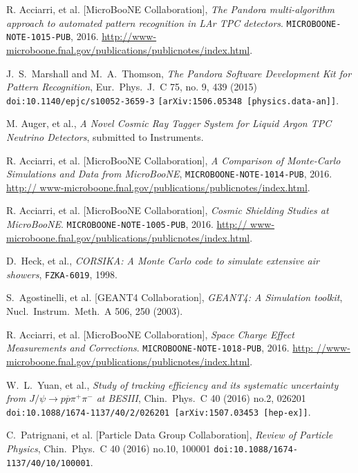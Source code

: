 \documentclass[a4paper]{scrartcl}
\begin{document}
\begin{thebibliography}{9}

   R. Acciarri, et al. [MicroBooNE Collaboration], \textit{The Pandora multi-algorithm approach to automated pattern recognition in LAr TPC detectors}. \texttt{MICROBOONE- NOTE-1015-PUB}, 2016. \url{http://www-microboone.fnal.gov/publications/publicnotes/index.html}.

   J.~S.~Marshall and M.~A.~Thomson, \textit{The Pandora Software Development Kit for Pattern Recognition}, Eur.\ Phys.\ J.\ C 75, no. 9, 439 (2015) \texttt{doi:10.1140/epjc/s10052-3659-3} \texttt{[arXiv:1506.05348 [physics.data-an]]}.

   M. Auger, et al., \textit{A Novel Cosmic Ray Tagger System for Liquid Argon TPC Neutrino Detectors}, submitted to Instruments.

   R. Acciarri, et al. [MicroBooNE Collaboration], \textit{A Comparison of Monte-Carlo Simulations and Data from MicroBooNE}, \texttt{MICROBOONE-NOTE-1014-PUB}, 2016. \url{http:// www-microboone.fnal.gov/publications/publicnotes/index.html}.

   R. Acciarri, et al. [MicroBooNE Collaboration], \textit{Cosmic Shielding Studies at MicroBooNE}. \texttt{MICROBOONE-NOTE-1005-PUB}, 2016. \url{http:// www-microboone.fnal.gov/publications/publicnotes/index.html}.

   D.~Heck, et al.,
  \textit{CORSIKA: A Monte Carlo code to simulate extensive air showers},
  \texttt{FZKA-6019}, 1998.

   S.~Agostinelli, et al. [GEANT4 Collaboration], \textit{GEANT4: A Simulation toolkit}, Nucl.\ Instrum.\ Meth.\ A {506}, 250 (2003).

   R. Acciarri, et al. [MicroBooNE Collaboration], \textit{Space Charge Effect Measurements and Corrections}. \texttt{MICROBOONE-NOTE-1018-PUB}, 2016. \url{http: //www-microboone.fnal.gov/publications/publicnotes/index.html}.

   W.~L.~Yuan, et al., \textit{Study of tracking efficiency and its systematic uncertainty from $J/\psi \to p \overline{p} \pi^+ \pi^-$ at BESIII}, Chin.\ Phys.\ C 40 (2016) no.2,  026201 \texttt{doi:10.1088/1674-1137/40/2/026201 [arXiv:1507.03453 [hep-ex]]}.

   C.~Patrignani, et al. [Particle Data Group Collaboration], \textit{Review of Particle Physics}, Chin.\ Phys.\ C 40 (2016) no.10,  100001 \texttt{doi:10.1088/1674-1137/40/10/100001}.


\end{thebibliography}
\end{document}

